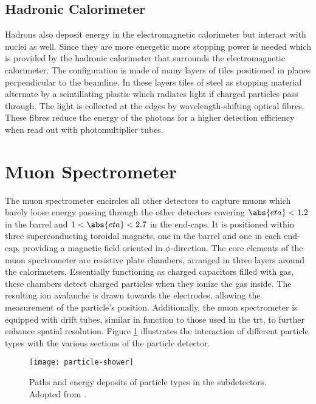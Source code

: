 \subsection{Hadronic Calorimeter}

Hadrons also deposit energy in the electromagnetic calorimeter but interact with nuclei as well. Since they are more energetic more stopping power is needed which is provided by the hadronic calorimeter that surrounds the electromagnetic calorimeter. The configuration is made of many layers of tiles positioned in planes perpendicular to the beamline. In these layers tiles of steel as stopping material alternate by a scintillating plastic which radiates light if charged particles pass through. The light is collected at the edges by wavelength-shifting optical fibres. These fibres reduce the energy of the photons for a higher detection efficiency when read out with photomultiplier tubes.

\section{Muon Spectrometer}\label{sec:muon_spectrometer}

The muon spectrometer encircles all other detectors to capture muons which barely loose energy passing through the other detectors covering $\abs{eta}<1.2$ in the barrel and $1<\abs{eta}<2.7$ in the end-caps. It is positioned within three superconducting toroidal magnets, one in the barrel and one in each end-cap, providing a magnetic field oriented in $\phi$-direction. The core elements of the muon spectrometer are resistive plate chambers, arranged in three layers around the calorimeters. Essentially functioning as charged capacitors filled with gas, these chambers detect charged particles when they ionize the gas inside. The resulting ion avalanche is drawn towards the electrodes, allowing the measurement of the particle's position. Additionally, the muon spectrometer is equipped with drift tubes, similar in function to those used in the \ac{trt}, to further enhance spatial resolution. Figure \ref{fig:particles_in_detector} illustrates the interaction of different particle types with the various sections of the particle detector.
\begin{figure}
    \centering
    \texttt{[image: particle-shower]}
    \caption[]{Paths and energy deposits of particle types in the subdetectors. Adopted from \citep{Guth:2765038}.}
    \label{fig:particles_in_detector}
\end{figure}

